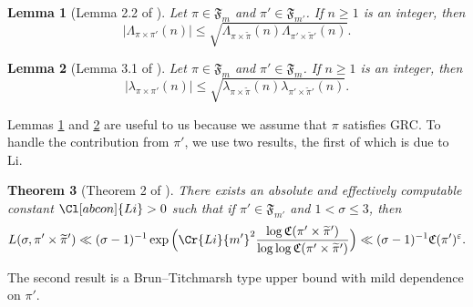 \documentclass[12pt,reqno]{amsart}
\newtheorem{thm}{Theorem}[section]
\newtheorem{lem}[thm]{Lemma}
\theoremstyle{remark}
\numberwithin{equation}{section}
\begin{document}
    \begin{lem}[Lemma 2.2 of \cite{ST}]
        \label{lem:lem2.2-ST} 
        Let $\pi \in \mathfrak{F}_m$ and $\pi' \in \mathfrak{F}_{m'}$.  If $n \ge 1$ is an integer, then
	\begin{equation*}
            |\Lambda_{\pi \times \pi'}(n)| \le \sqrt{\Lambda_{\pi \times \widetilde{\pi}}(n) \Lambda_{\pi' \times \widetilde{\pi}'}(n)}.
	\end{equation*}
    \end{lem}


    \begin{lem}[Lemma 3.1 of \cite{JLW}]
        \label{lem:lem3.1-JLW}
        Let $\pi \in \mathfrak{F}_m$ and $\pi' \in \mathfrak{F}_m$.  If $n\geq 1$ is an integer, then
        \begin{equation*}
            |\lambda_{\pi\times\pi'}(n)| \le \sqrt{\lambda_{\pi \times \widetilde{\pi}}(n)\lambda_{\pi'\times\widetilde{\pi}'}(n)}.
	\end{equation*}
    \end{lem}
  	
    Lemmas \ref{lem:lem2.2-ST} and \ref{lem:lem3.1-JLW} are useful to us because we assume that $\pi$ satisfies GRC.  To handle the contribution from $\pi'$, we use two results, the first of which is due to Li.
	
    \begin{thm}[Theorem 2 of \cite{L}]
        \label{thm:Xiannan-Li} 
        There exists an absolute and effectively computable constant $\Cl[abcon]{Li} >0$ such that if $\pi' \in \mathfrak{F}_{m'}$ and $1 < \sigma \le 3$, then 
		\begin{equation*}
                L(\sigma, \pi' \times \widetilde{\pi}') \ll (\sigma-1)^{-1} \exp\Big( \Cr{Li} {m'}^2\frac{\log \mathfrak{C}(\pi' \times \widetilde{\pi}')}{\log\log \mathfrak{C}(\pi' \times \widetilde{\pi}')}\Big) \ll (\sigma-1)^{-1}\mathfrak{C}(\pi')^\varepsilon.
		\end{equation*}
    \end{thm}

    The second result is a Brun--Titchmarsh type upper bound with mild dependence on $\pi'$.
    
\end{document}
